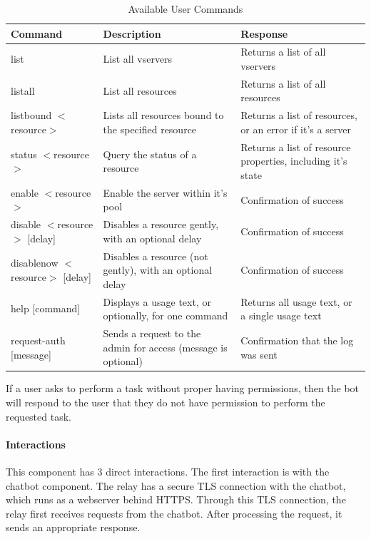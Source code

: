 \begin{longtable}[h]{ | p{1.85in} | p{2.7in} | p{1.95in} |  }
     \caption{Available User Commands}
     \\\hline
     \textbf{Command} & \textbf{Description} & \textbf{Response} \\
     \hline
     list
     & List all vservers
     & Returns a list of all vservers\\
     \hline
     listall
     & List all resources
     & Returns a list of all resources\\
     \hline
     listbound $<$resource$>$
     & Lists all resources bound to the specified resource
     & Returns a list of resources, or an error if it's a server \\
     \hline
     status $<$resource$>$
     & Query the status of a resource
     & Returns a list of resource properties, including it's state \\
     \hline
     enable $<$resource$>$
     & Enable the server within it's pool
     & Confirmation of success \\
     \hline
     disable $<$resource$>$ [delay]
     & Disables a resource gently, with an optional delay
     & Confirmation of success \\
     \hline
     disablenow $<$resource$>$ [delay]
     & Disables a resource (not gently), with an optional delay
     & Confirmation of success \\
     \hline
     help [command]
     & Displays a usage text, or optionally, for one command
     & Returns all usage text, or a single usage text \\
     \hline
     request-auth [message]
     & Sends a request to the admin for access (message is optional)
     & Confirmation that the log was sent \\
     \hline
\end{longtable}

If a user asks to perform a task without proper having permissions, then the bot will respond to the user that they do not have permission to perform the requested task.

\paragraph{Interactions}
This component has 3 direct interactions.
The first interaction is with the chatbot component.
The relay has a secure TLS connection with the chatbot, which runs as a webserver behind HTTPS.
Through this TLS connection, the relay first receives requests from the chatbot.
After processing the request, it sends an appropriate response.

